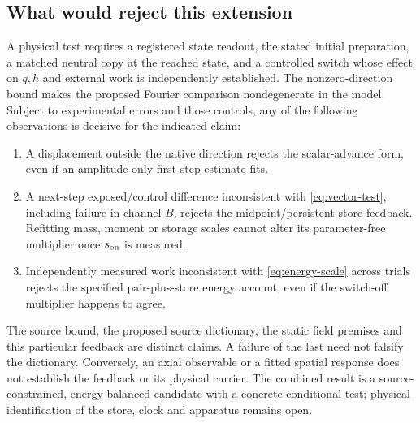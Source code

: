 \subsection{What would reject this extension}
A physical test requires a registered state readout, the stated initial preparation, a matched neutral copy at the reached state, and a controlled switch whose effect on \(q,h\) and external work is independently established. The nonzero-direction bound makes the proposed Fourier comparison nondegenerate in the model. Subject to experimental errors and those controls, any of the following observations is decisive for the indicated claim:
\begin{enumerate}
 \item A displacement outside the native direction rejects the scalar-advance form, even if an amplitude-only first-step estimate fits.
 \item A next-step exposed/control difference inconsistent with \eqref{eq:vector-test}, including failure in channel \(B\), rejects the midpoint/persistent-store feedback. Refitting mass, moment or storage scales cannot alter its parameter-free multiplier once \(s_{\rm on}\) is measured.
 \item Independently measured work inconsistent with \eqref{eq:energy-scale} across trials rejects the specified pair-plus-store energy account, even if the switch-off multiplier happens to agree.
\end{enumerate}
The source bound, the proposed source dictionary, the static field premises and this particular feedback are distinct claims. A failure of the last need not falsify the dictionary. Conversely, an axial observable or a fitted spatial response does not establish the feedback or its physical carrier. The combined result is a source-constrained, energy-balanced candidate with a concrete conditional test; physical identification of the store, clock and apparatus remains open.
